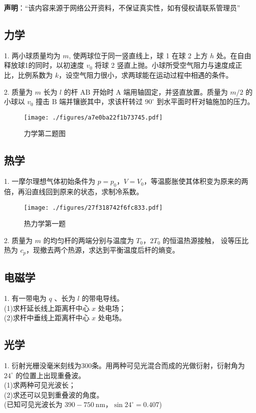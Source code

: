 
\textbf{声明}：“该内容来源于网络公开资料，不保证真实性，如有侵权请联系管理员”

\subsection{力学}
1. 两小球质量均为 $m$, 使两球位于同一竖直线上，球 1 在球 2 上方 $h$ 处。在自由释放球1的同时，以初速度 $v_{0}$ 将球 2 竖直上抛。小球所受空气阻力与速度成正比，比例系数为 $k$，设空气阻力很小，求两球能在运动过程中相遇的条件。

2. 质量为 $m$ 长为 $l$ 的杆 $\mathrm{AB}$ 开始时 $\mathrm{A}$ 端用轴固定，并竖直放置。质量为 $m / 2$ 的小球以 $v_{0}$ 撞击 $\mathrm{B}$ 端并镶嵌其中，求该杆转过 $90^{\circ}$ 到水平面时杆对轴施加的压力。
\begin{figure}[ht]
\centering
\texttt{[image: ./figures/a7e0ba22f1b73745.pdf]}
\caption{力学第二题图} \label{fig_NJU19_1}
\end{figure}
\subsection{热学}
1. 一摩尔理想气体初始条件为 $p=p_{0}$，$V=V_{0}$，等温膨胀使其体积变为原来的两倍，再沿直线回到原来的状态，求制冷系数。
\begin{figure}[ht]
\centering
\texttt{[image: ./figures/27f318742f6fc833.pdf]}
\caption{热力学第一题} \label{fig_NJU19_2}
\end{figure}
2. 质量为 $m$ 的均匀杆的两端分别与温度为 $T_{0}$，$2T_{0}$ 的恒温热源接触， 设等压比热为 $c_{p}$，现撤去两个热源，求达到平衡温度后杆的熵变。
\subsection{电磁学}
1. 有一带电为 $q$ 、长为 $l$ 的带电导线。\\
(1)求杆延长线上距离杆中心 $x$ 处电场；\\
(2)求杆中垂线上距离杆中心 $x$ 处电场。
\subsection{光学}
1. 衍射光栅没毫米刻线为300条。用两种可见光混合而成的光做衍射，衍射角为 $24^{\circ}$ 的位置上出现重叠波。\\
(1)求两种可见光波长；\\
(2)求还可以见到重叠波的角度。\\
(已知可见光波长为 $390-750 \mathrm{~nm}$，$\sin 24^{\circ}=0.407$)
